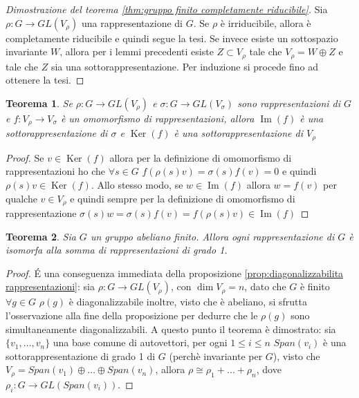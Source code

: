 \documentclass[11pt]{article}
\theoremstyle{plain}
\newtheorem{thm}{Teorema}[section]
\theoremstyle{definition}
\theoremstyle{remark}
\DeclareMathOperator{\Ker}{Ker}
\DeclareMathOperator{\Imm}{Im}
\begin{document}
\begin{proof}[Dimostrazione del teorema \ref{thm:gruppo finito completamente riducibile}]
Sia $\rho: G \to GL(V_\rho)$ una rappresentazione di $G$. Se $\rho$ è irriducibile, allora è completamente riducibile e quindi segue la tesi. Se invece esiste un sottospazio invariante $W$, allora per i lemmi precedenti esiste $Z \subset V_\rho$ tale che $V_\rho = W \oplus Z$ e tale che $Z$ sia una sottorappresentazione. Per induzione si procede fino ad ottenere la tesi. %
\end{proof}




\begin{thm} Se $\rho: G \to GL(V_\rho)$ e $\sigma: G \to GL(V_\sigma)$ sono rappresentazioni di $G$ e $f: V_\rho \to V_\sigma$ è un omomorfismo di rappresentazioni, allora $\Imm(f)$ è una sottorappresentazione di $\sigma$ e $\Ker(f)$ è una sottorappresentazione di $V_\rho$
\end{thm}
\begin{proof}
Se $v\in \Ker(f)$ allora per la definizione di omomorfismo di rappresentazioni ho che $\forall s\in G$ $f(\rho(s)v)=\sigma(s)f(v)=0$ e quindi $\rho(s)v\in \Ker(f)$. Allo stesso modo, se $w\in \Imm(f)$ allora $w=f(v)$ per qualche $v\in V_\rho$ e quindi sempre per la definizione di omomorfismo di rappresentazione $\sigma(s)w=\sigma(s)f(v)=f(\rho(s)v)\in \Imm(f)$
\end{proof}




\begin{thm}Sia $G$ un gruppo abeliano finito. Allora ogni rappresentazione di $G$ è isomorfa alla somma di rappresentazioni di grado 1.
\end{thm}
\begin{proof}
	\'E una conseguenza immediata della proposizione \eqref{prop:diagonalizzabilita rappresentazioni}: sia $\rho:G\to GL(V_{\rho})$, con $\dim V_{\rho} = n$, dato che $G$ è finito $\forall g\in G$ $\rho(g)$ è diagonalizzabile inoltre, visto che è abeliano, si sfrutta l'osservazione alla fine della proposizione per dedurre che le $\rho(g)$ sono simultaneamente diagonalizzabili. A questo punto il teorema è dimostrato: sia $\{v_1,\ldots,v_n\}$ una base comune di autovettori, per ogni $1\leq i\leq n$ $Span(v_i)$ è una sottorappresentazione di grado 1 di $G$ (perchè invariante per $G$), visto che $V_{\rho}=Span(v_1)\oplus\ldots\oplus Span(v_n)$, allora $\rho\cong\rho_1+\ldots+\rho_n$, dove $\rho_i:G\to GL(Span(v_i))$.
\end{proof}
\end{document}
